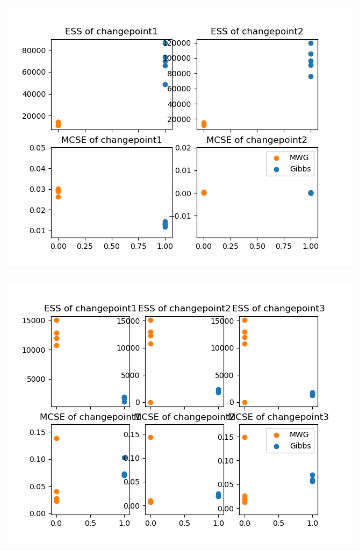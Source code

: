 \begin{figure}[H]
\begin{subfigure}{.3\textwidth}
    	\includegraphics[width=\linewidth]{../../plots/ess_se_M3_N100_NMCMC3_seed0_diffind2.png}
	\end{subfigure}
	\begin{subfigure}{.3\textwidth}
	    \centering
    	\includegraphics[width=\linewidth]{../../plots/ess_se_M4_N100_NMCMC3_seed0_diffind2.png}
	\end{subfigure}
	\begin{subfigure}{.3\textwidth}
	    \centering

\end{subfigure}
\end{figure}
